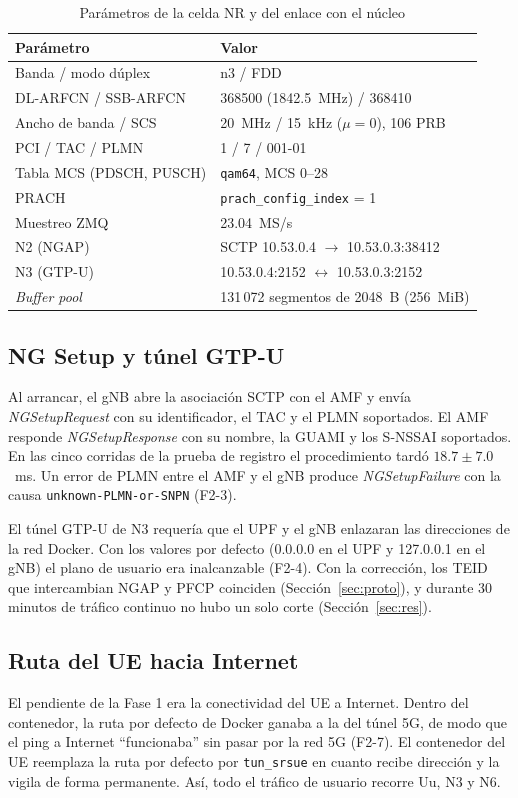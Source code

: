 \documentclass[conference]{IEEEtran}
\begin{document}
\begin{table}[!t]
\caption{Parámetros de la celda NR y del enlace con el núcleo}
\label{tab:celda}
\centering
\footnotesize
\renewcommand{\arraystretch}{1.12}
\begin{tabular}{p{2.8cm}p{4.8cm}}
\toprule
\textbf{Parámetro} & \textbf{Valor} \\
\midrule
Banda / modo dúplex & n3 / FDD \\
DL-ARFCN / SSB-ARFCN & 368500 (1842.5~MHz) / 368410 \\
Ancho de banda / SCS & 20~MHz / 15~kHz ($\mu=0$), 106 PRB \\
PCI / TAC / PLMN & 1 / 7 / 001-01 \\
Tabla MCS (PDSCH, PUSCH) & \texttt{qam64}, MCS 0--28 \\
PRACH & \texttt{prach\_config\_index} = 1 \\
Muestreo ZMQ & 23.04~MS/s \\
N2 (NGAP) & SCTP 10.53.0.4 $\rightarrow$ 10.53.0.3:38412 \\
N3 (GTP-U) & 10.53.0.4:2152 $\leftrightarrow$ 10.53.0.3:2152 \\
\textit{Buffer pool} & 131\,072 segmentos de 2048~B (256~MiB) \\
\bottomrule
\end{tabular}
\end{table}

\subsection{NG Setup y túnel GTP-U}
Al arrancar, el gNB abre la asociación SCTP con el AMF y envía \textit{NGSetupRequest} \cite{ts38413} con su identificador, el TAC y el PLMN soportados. El AMF responde \textit{NGSetupResponse} con su nombre, la GUAMI y los S-NSSAI soportados. En las cinco corridas de la prueba de registro el procedimiento tardó $18.7\pm7.0$~ms. Un error de PLMN entre el AMF y el gNB produce \textit{NGSetupFailure} con la causa \texttt{unknown-PLMN-or-SNPN} (F2-3).

El túnel GTP-U de N3 requería que el UPF y el gNB enlazaran las direcciones de la red Docker. Con los valores por defecto (0.0.0.0 en el UPF y 127.0.0.1 en el gNB) el plano de usuario era inalcanzable (F2-4). Con la corrección, los TEID que intercambian NGAP y PFCP coinciden (Sección~\ref{sec:proto}), y durante 30 minutos de tráfico continuo no hubo un solo corte (Sección~\ref{sec:res}).

\subsection{Ruta del UE hacia Internet}
El pendiente de la Fase 1 era la conectividad del UE a Internet. Dentro del contenedor, la ruta por defecto de Docker ganaba a la del túnel 5G, de modo que el ping a Internet ``funcionaba'' sin pasar por la red 5G (F2-7). El contenedor del UE reemplaza la ruta por defecto por \texttt{tun\_srsue} en cuanto recibe dirección y la vigila de forma permanente. Así, todo el tráfico de usuario recorre Uu, N3 y N6.
\end{document}
